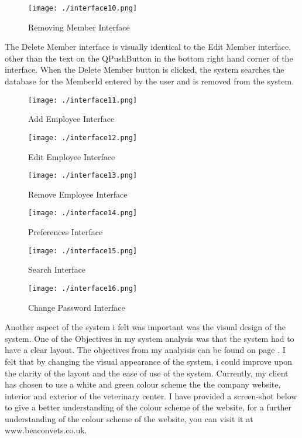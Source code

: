 \begin{figure}[H]
    \texttt{[image: ./interface10.png]}
    \caption{Removing Member Interface} \label{fig:removing-member-interface}
\end{figure}

The Delete Member interface is visually identical to the Edit Member interface, other than the text on the QPushButton in the bottom right hand corner of the interface. When the Delete Member button is clicked, the system searches the database for the MemberId entered by the user and is removed from the system.

\begin{figure}[H]
    \texttt{[image: ./interface11.png]}
    \caption{Add Employee Interface} \label{fig:adding-employee-interface}
\end{figure}


\begin{figure}[H]
    \texttt{[image: ./interface12.png]}
    \caption{Edit Employee Interface} \label{fig:edit-employee-interface}
\end{figure}

\begin{figure}[H]
    \texttt{[image: ./interface13.png]}
    \caption{Remove Employee Interface} \label{fig:removing-employee-interface}
\end{figure}

\begin{figure}[H]
    \texttt{[image: ./interface14.png]}
    \caption{Preferences Interface} \label{fig:preferences-interface}
\end{figure}

\begin{figure}[H]
    \texttt{[image: ./interface15.png]}
    \caption{Search Interface} \label{fig:search-interface}
\end{figure}

\begin{figure}[H]
    \texttt{[image: ./interface16.png]}
    \caption{Change Password Interface} \label{fig:change-password-interface}
\end{figure}

Another aspect of the system i felt was important was the visual design of the system. One of the Objectives in my system analysis was that the system had to have a clear layout. The objectives from my analyisis can be found on page \pageref{ref:objectives}. I felt that by changing the visual appearance of the system, i could improve upon the clarity of the layout and the ease of use of the system. Currently, my client has chosen to use a white and green colour scheme the the company website, interior and exterior of the veterinary center. I have provided a screen-shot below to give a better understanding of the colour scheme of the website, for a further understanding of the colour scheme of the website, you can visit it at www.beaconvets.co.uk.

